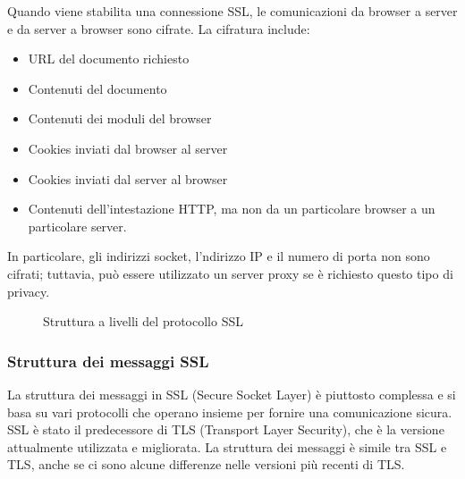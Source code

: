 \documentclass{article}
\theoremstyle{definition}
\begin{document}
Quando viene stabilita una connessione SSL, le comunicazioni da browser a server e da server a browser sono cifrate. La cifratura include:
\begin{itemize}
    \item URL del documento richiesto
    \item Contenuti del documento
    \item Contenuti dei moduli del browser
    \item Cookies inviati dal browser al server
    \item Cookies inviati dal server al browser
    \item Contenuti dell'intestazione HTTP, ma non da un particolare browser a un particolare server.
\end{itemize}

In particolare, gli indirizzi socket, l'ndirizzo IP e il numero di porta non sono cifrati; tuttavia, può essere utilizzato un server proxy se è richiesto questo tipo di privacy.

\begin{figure}[htbp]
\centering
{}
\caption{Struttura a livelli del protocollo SSL}
\end{figure}

\subsubsection{Struttura dei messaggi SSL}
La struttura dei messaggi in SSL (Secure Socket Layer) è piuttosto complessa e si basa su vari protocolli che operano insieme per fornire una comunicazione sicura. SSL è stato il predecessore di TLS (Transport Layer Security), che è la versione attualmente utilizzata e migliorata. La struttura dei messaggi è simile tra SSL e TLS, anche se ci sono alcune differenze nelle versioni più recenti di TLS.
\end{document}
